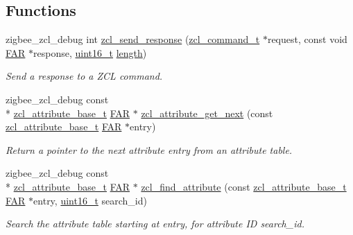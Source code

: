 \subsection*{Functions}
\begin{DoxyCompactItemize}
\item 
zigbee\-\_\-zcl\-\_\-debug int \hyperlink{group__zcl_ga947f6103f6bbe716ddeacbaed65e3ce3}{zcl\-\_\-send\-\_\-response} (\hyperlink{structzcl__command__t}{zcl\-\_\-command\-\_\-t} $\ast$request, const void \hyperlink{group__hal_gaef060b3456fdcc093a7210a762d5f2ed}{F\-A\-R} $\ast$response, \hyperlink{group__hal_ga5a8b2dc9e45a9ee81a94ef304fb62505}{uint16\-\_\-t} \hyperlink{group__zdo_gab2b3adeb2a67e656ff030b56727fd0ac}{length})
\begin{DoxyCompactList}\small\item\em Send a response to a Z\-C\-L command. \end{DoxyCompactList}\item 
zigbee\-\_\-zcl\-\_\-debug const \\*
\hyperlink{structzcl__attribute__base__t}{zcl\-\_\-attribute\-\_\-base\-\_\-t} \hyperlink{group__hal_gaef060b3456fdcc093a7210a762d5f2ed}{F\-A\-R} $\ast$ \hyperlink{group__zcl_ga66d9c3c646422e71fed6c94d67c14fdd}{zcl\-\_\-attribute\-\_\-get\-\_\-next} (const \hyperlink{structzcl__attribute__base__t}{zcl\-\_\-attribute\-\_\-base\-\_\-t} \hyperlink{group__hal_gaef060b3456fdcc093a7210a762d5f2ed}{F\-A\-R} $\ast$entry)
\begin{DoxyCompactList}\small\item\em Return a pointer to the next attribute entry from an attribute table. \end{DoxyCompactList}\item 
zigbee\-\_\-zcl\-\_\-debug const \\*
\hyperlink{structzcl__attribute__base__t}{zcl\-\_\-attribute\-\_\-base\-\_\-t} \hyperlink{group__hal_gaef060b3456fdcc093a7210a762d5f2ed}{F\-A\-R} $\ast$ \hyperlink{group__zcl_ga00ac8dd36cad01d9479a84c296380f40}{zcl\-\_\-find\-\_\-attribute} (const \hyperlink{structzcl__attribute__base__t}{zcl\-\_\-attribute\-\_\-base\-\_\-t} \hyperlink{group__hal_gaef060b3456fdcc093a7210a762d5f2ed}{F\-A\-R} $\ast$entry, \hyperlink{group__hal_ga5a8b2dc9e45a9ee81a94ef304fb62505}{uint16\-\_\-t} search\-\_\-id)
\begin{DoxyCompactList}\small\item\em Search the attribute table starting at {\ttfamily entry}, for attribute I\-D {\ttfamily search\-\_\-id}. \end{DoxyCompactList}\item 

\end{DoxyCompactItemize}

